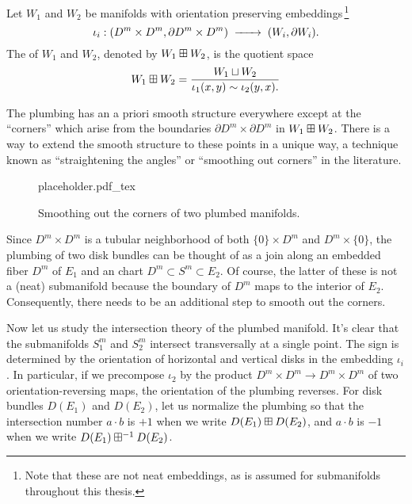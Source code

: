\begin{definition}\label{def:plumbing}
	Let $W_1$ and $W_2$ be manifolds with orientation preserving embeddings\,\footnote{Note that these are not neat embeddings, as is assumed for submanifolds throughout this thesis.}
	\[\iota_i : (D^m\times D^m, \partial D^m\times D^m)\lkxto (W_i, \partial W_i).\]
	The  of $W_1$ and $W_2$, denoted by $W_1\boxplus W_2$, is the quotient space
	\[
		W_1\boxplus W_2 = \frac{W_1\sqcup W_2}{\iota_1(x,y)\sim \iota_2(y,x).}
	\]
\end{definition}

\begin{remark}\label{rmk:smoothing-corners}
	The plumbing has an a priori smooth structure everywhere except at the ``corners'' which arise from the boundaries $\partial D^m\times \partial D^m$ in $W_1\boxplus W_2$. There is a way to extend the smooth structure to these points in a unique way, a technique known as ``straightening the angles'' or ``smoothing out corners'' in the literature.

	\cite{milnor1958manifolds}

	\begin{figure}[ht]
		\centering
		{placeholder.pdf_tex}
		\caption{Smoothing out the corners of two plumbed manifolds.}\label{fig:smoothing-corners}
	\end{figure}
\end{remark}

\begin{remark}
	Since $D^m\times D^m$ is a tubular neighborhood of both $\{0\}\times D^m$ and $D^m\times\{0\}$, the plumbing of two disk bundles can be thought of as a join along an embedded fiber $D^m$ of $E_1$ and an chart $D^m\subset S^m\subset E_2$. Of course, the latter of these is not a (neat) submanifold because the boundary of $D^m$ maps to the interior of $E_2$. Consequently, there needs to be an additional step to smooth out the corners.
\end{remark}

Now let us study the intersection theory of the plumbed manifold. It's clear that the submanifolds $S_1^m$ and $S_2^m$ intersect transversally at a single point. The sign is determined by the orientation of horizontal and vertical disks in the embedding $\iota_i$. In particular, if we precompose $\iota_2$ by the product $D^m\times D^m\to D^m\times D^m$ of two orientation-reversing maps, the orientation of the plumbing reverses. For disk bundles $D(E_1)$ and $D(E_2)$, let us normalize the plumbing so that the intersection number $a\cdot b$ is $+1$ when we write $D(E_1)\boxplus D(E_2)$, and $a\cdot b$ is $-1$ when we write $D(E_1)\boxplus^{-1} D(E_2)$.

